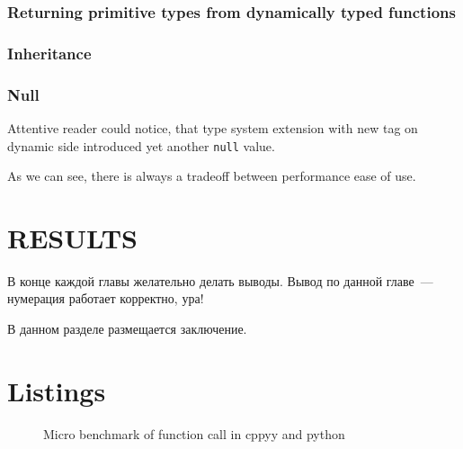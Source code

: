 \documentclass[times, %
               specification,annotation, %
               titlepage-extra-ru,specification-extra-ru,annotation-extra-ru, %
               languages={russian,english} %
              ]{itmo-student-thesis}
\begin{document}
\subsection{Returning primitive types from dynamically typed functions}
\subsection{Inheritance}
\subsection{Null}
Attentive reader could notice, that type system extension with new tag on dynamic side introduced yet another \texttt{null} value.

\chapterconclusion
As we can see, there is always a tradeoff between performance ease of use.

\chapter{RESULTS}

\chapterconclusion

В конце каждой главы желательно делать выводы. Вывод по данной главе~--- нумерация работает корректно, ура!

\startconclusionpage

В данном разделе размещается заключение.

\printmainbibliography

\appendix

\chapter{Listings}
\begin{figure}[!h]
    \caption{Micro benchmark of function call in cppyy and python}\label{apx:cppyy-bench}
    
\end{figure}
\end{document}
